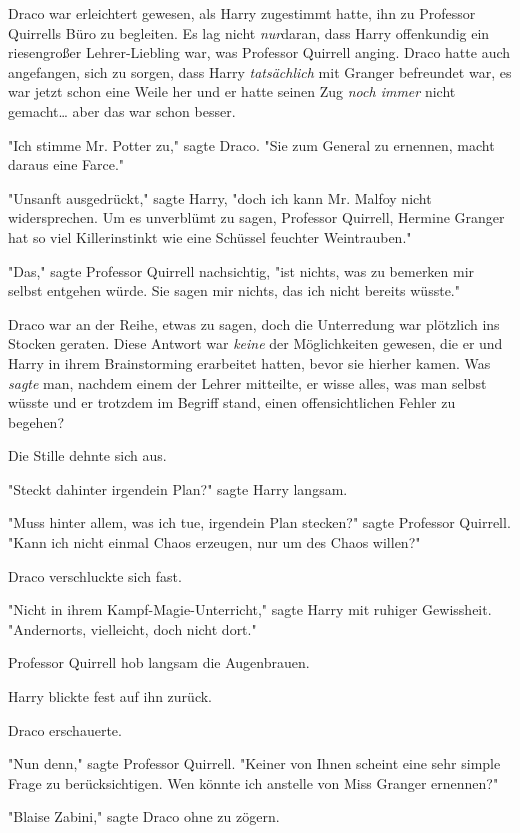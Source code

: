 {Draco war erleichtert gewesen, als Harry zugestimmt hatte, ihn zu Professor Quirrells Büro zu begleiten. Es lag nicht \emph{nur}daran, dass Harry offenkundig ein riesengroßer Lehrer-Liebling war, was Professor Quirrell anging. Draco hatte auch angefangen, sich zu sorgen, dass Harry \emph{tatsächlich} mit Granger befreundet war, es war jetzt schon eine Weile her und er hatte seinen Zug \emph{noch immer} nicht gemacht… aber das war schon besser.

"Ich stimme Mr. Potter zu," sagte Draco. "Sie zum General zu ernennen, macht daraus eine Farce."

"Unsanft ausgedrückt," sagte Harry, "doch ich kann Mr. Malfoy nicht widersprechen. Um es unverblümt zu sagen, Professor Quirrell, Hermine Granger hat so viel Killerinstinkt wie eine Schüssel feuchter Weintrauben."

"Das," sagte Professor Quirrell nachsichtig, "ist nichts, was zu bemerken mir selbst entgehen würde. Sie sagen mir nichts, das ich nicht bereits wüsste."

Draco war an der Reihe, etwas zu sagen, doch die Unterredung war plötzlich ins Stocken geraten. Diese Antwort war \emph{keine} der Möglichkeiten gewesen, die er und Harry in ihrem Brainstorming erarbeitet hatten, bevor sie hierher kamen. Was \emph{sagte} man, nachdem einem der Lehrer mitteilte, er wisse alles, was man selbst wüsste und er trotzdem im Begriff stand, einen offensichtlichen Fehler zu begehen?

Die Stille dehnte sich aus.

"Steckt dahinter irgendein Plan?" sagte Harry langsam.

"Muss hinter allem, was ich tue, irgendein Plan stecken?" sagte Professor Quirrell. "Kann ich nicht einmal Chaos erzeugen, nur um des Chaos willen?"

Draco verschluckte sich fast.

"Nicht in ihrem Kampf-Magie-Unterricht," sagte Harry mit ruhiger Gewissheit. "Andernorts, vielleicht, doch nicht dort."

Professor Quirrell hob langsam die Augenbrauen.

Harry blickte fest auf ihn zurück.

Draco erschauerte.

"Nun denn," sagte Professor Quirrell. "Keiner von Ihnen scheint eine sehr simple Frage zu berücksichtigen. Wen könnte ich anstelle von Miss Granger ernennen?"

"Blaise Zabini," sagte Draco ohne zu zögern.

}
